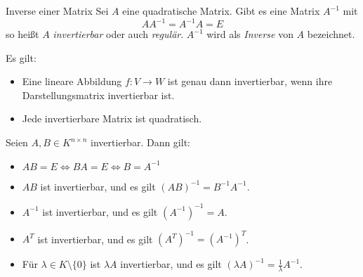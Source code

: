 \documentclass[german]{../spicker}
\begin{document}
\begin{defi}{Inverse einer Matrix}
    Sei $A$ eine quadratische Matrix.
    Gibt es eine Matrix $A^{-1}$ mit
    $$
        AA^{-1} = A^{-1}A = E
    $$
    so heißt $A$ \emph{invertierbar} oder auch \emph{regulär}.
    $A^{-1}$ wird als \emph{Inverse} von $A$ bezeichnet.

    Es gilt:
    \begin{itemize}
        \item Eine lineare Abbildung $f : V \to W$ ist genau dann invertierbar, wenn ihre Darstellungsmatrix invertierbar ist.
        \item Jede invertierbare Matrix ist quadratisch.
    \end{itemize}

    Seien $A, B \in K^{n\times n}$ invertierbar.
    Dann gilt:
    \begin{itemize}
        \item $AB = E \iff BA = E \iff B = A^{-1}$
        \item $AB$ ist invertierbar, und es gilt $(AB)^{-1} = B^{-1}A^{-1}$.
        \item $A^{-1}$ ist invertierbar, und es gilt $(A^{-1})^{-1} = A$.
        \item $A^T$ ist invertierbar, und es gilt $(A^T)^{-1} = (A^{-1})^T$.
        \item Für $\lambda \in K \setminus \{0\}$ ist $\lambda A$ invertierbar, und es gilt $(\lambda A)^{-1} = \frac{1}{\lambda}A^{-1}$.
    \end{itemize}
\end{defi}
\end{document}
